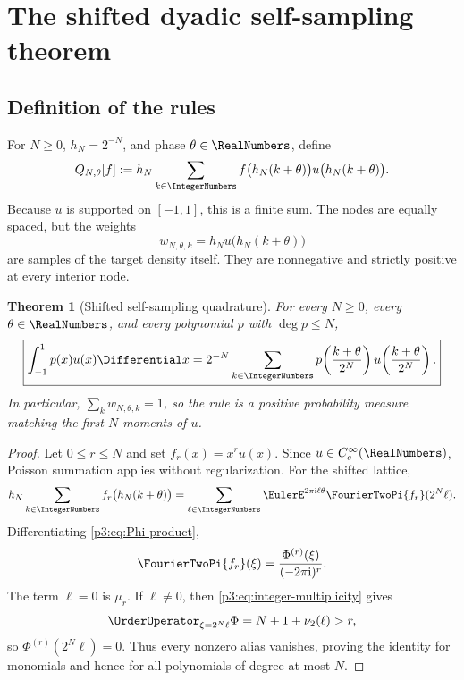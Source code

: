 \documentclass[11pt,oneside]{article}
\numberwithin{equation}{section}
\newtheorem{theorem}{Theorem}[section]
\theoremstyle{definition}
\theoremstyle{remark}
\begin{document}
\section{The shifted dyadic self-sampling theorem}
\label{p3:sec:self-sampling}

\subsection{Definition of the rules}

For $N\ge0$, $h_N=2^{-N}$, and phase $\theta\in\RealNumbers$, define
\begin{equation}
 Q_{N,\theta}[f]
 :=h_N\sum_{k\in\IntegerNumbers}
 f\bigl(h_N(k+\theta)\bigr)
 u\bigl(h_N(k+\theta)\bigr).
 \label{p3:eq:Q-def}
\end{equation}
Because $u$ is supported on $[-1,1]$, this is a finite sum.  The nodes are equally spaced, but the weights
\begin{equation}
 w_{N,\theta,k}=h_Nu\bigl(h_N(k+\theta)\bigr)
 \label{p3:eq:self-weights}
\end{equation}
are samples of the target density itself.  They are nonnegative and strictly positive at every interior node.

\begin{theorem}[Shifted self-sampling quadrature]
\label{p3:thm:self-sampling}
For every $N\ge0$, every $\theta\in\RealNumbers$, and every polynomial $p$ with $\deg p\le N$,
\begin{equation}
 \boxed{\displaystyle
 \int_{-1}^{1}p(x)u(x)\Differential x
 =2^{-N}\sum_{k\in\IntegerNumbers}
 p\!\left(\frac{k+\theta}{2^N}\right)
 u\!\left(\frac{k+\theta}{2^N}\right).}
 \label{p3:eq:self-sampling-main}
\end{equation}
In particular, $\sum_k w_{N,\theta,k}=1$, so the rule is a positive probability measure matching the first $N$ moments of $u$.
\end{theorem}

\begin{proof}
Let $0\le r\le N$ and set $f_r(x)=x^ru(x)$.  Since $u\in C_c^\infty(\RealNumbers)$, Poisson summation applies without regularization.  For the shifted lattice,
\begin{equation}
 h_N\sum_{k\in\IntegerNumbers}f_r\bigl(h_N(k+\theta)\bigr)
 =\sum_{\ell\in\IntegerNumbers}\EulerE^{2\pi\iu\ell\theta}
 \FourierTwoPi{f_r}(2^N\ell).
 \label{p3:eq:shifted-Poisson}
\end{equation}
Differentiating \eqref{p3:eq:Phi-product},
\begin{equation}
 \FourierTwoPi{f_r}(\xi)=\frac{\Phi^{(r)}(\xi)}{(-2\pi\iu)^r}.
 \label{p3:eq:monomial-transform}
\end{equation}
The term $\ell=0$ is $\mu_r$.  If $\ell\ne0$, then \eqref{p3:eq:integer-multiplicity} gives
\[
 \OrderOperator_{\xi=2^N\ell}\Phi
 =N+1+\nu_2(\ell)>r,
\]
so $\Phi^{(r)}(2^N\ell)=0$.  Thus every nonzero alias vanishes, proving the identity for monomials and hence for all polynomials of degree at most $N$.
\end{proof}
\end{document}
